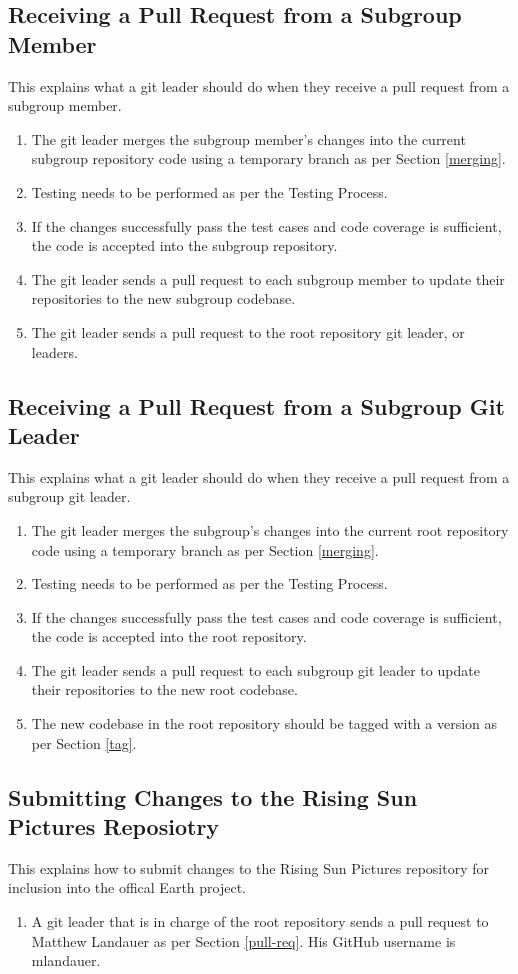 \documentclass{article}
\begin{document}
\subsection{Receiving a Pull Request from a Subgroup Member}
\label{pull-req-from-member}
This explains what a git leader should do when they receive a pull request from a subgroup member.
\begin{enumerate}
	\item The git leader merges the subgroup member's changes into the current subgroup repository code using a temporary branch as per Section \ref{merging}.
	\item Testing needs to be performed as per the Testing Process.
	\item If the changes successfully pass the test cases and code coverage is sufficient, the code is accepted into the subgroup repository.
	\item The git leader sends a pull request to each subgroup member to update their repositories to the new subgroup codebase.
	\item The git leader sends a pull request to the root repository git leader, or leaders.
\end{enumerate}

\subsection{Receiving a Pull Request from a Subgroup Git Leader}
\label{pull-req-from-member}
This explains what a git leader should do when they receive a pull request from a subgroup git leader.
\begin{enumerate}
	\item The git leader merges the subgroup's changes into the current root repository code using a temporary branch as per Section \ref{merging}.
	\item Testing needs to be performed as per the Testing Process.
	\item If the changes successfully pass the test cases and code coverage is sufficient, the code is accepted into the root repository.
	\item The git leader sends a pull request to each subgroup git leader to update their repositories to the new root codebase.
	\item The new codebase in the root repository should be tagged with a version as per Section \ref{tag}.
\end{enumerate}

\subsection{Submitting Changes to the Rising Sun Pictures Reposiotry}
\label{send-to-rsp}
This explains how to submit changes to the Rising Sun Pictures repository for inclusion into the offical Earth project.
\begin{enumerate}
	\item A git leader that is in charge of the root repository sends a pull request to Matthew Landauer as per Section \ref{pull-req}. His GitHub username is mlandauer.
\end{enumerate}
\end{document}
